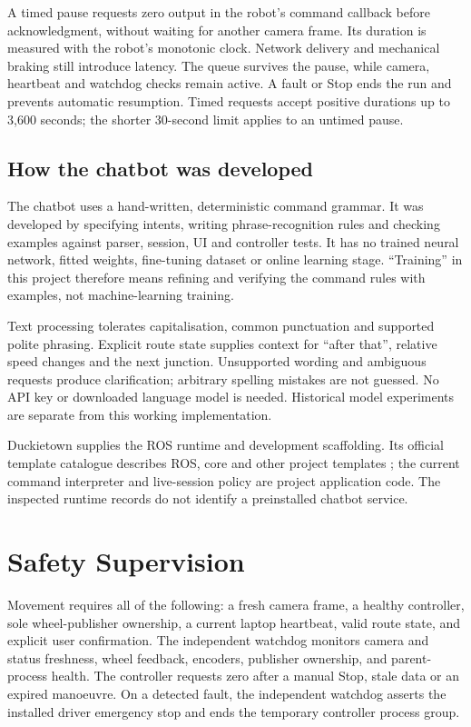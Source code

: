\documentclass[10pt,a4paper,twocolumn]{article}
\begin{document}
A timed pause requests zero output in the robot's command callback before
acknowledgment, without waiting for another camera frame. Its duration is
measured with the robot's monotonic clock. Network delivery and mechanical
braking still introduce latency. The queue survives the pause, while camera,
heartbeat and watchdog checks remain active. A fault or Stop ends the run and
prevents automatic resumption. Timed requests accept positive durations up to
3,600 seconds; the shorter 30-second limit applies to an untimed pause.

\subsection{How the chatbot was developed}

The chatbot uses a hand-written, deterministic command grammar. It was
developed by specifying intents, writing phrase-recognition rules and checking
examples against parser, session, UI and controller tests. It has no trained
neural network, fitted weights, fine-tuning dataset or online learning stage.
``Training'' in this project therefore means refining and verifying the command
rules with examples, not machine-learning training.

Text processing tolerates capitalisation, common punctuation and supported
polite phrasing. Explicit route state supplies context for ``after that'',
relative speed changes and the next junction. Unsupported wording and
ambiguous requests produce clarification; arbitrary spelling mistakes are not
guessed. No API key or downloaded language model is needed. Historical model
experiments are separate from this working implementation.

Duckietown supplies the ROS runtime and development scaffolding. Its official
template catalogue describes ROS, core and other project templates
\cite{templates}; the current command interpreter and live-session policy are
project application code. The inspected runtime records do not identify a
preinstalled chatbot service.

\section{Safety Supervision}

Movement requires all of the following: a fresh camera frame, a healthy
controller, sole wheel-publisher ownership, a current laptop heartbeat, valid
route state, and explicit user confirmation. The independent watchdog monitors
camera and status freshness, wheel feedback, encoders, publisher ownership, and
parent-process health. The controller requests zero after a manual Stop, stale data or an expired
manoeuvre. On a detected fault, the independent watchdog asserts the installed
driver emergency stop and ends the temporary controller process group.
\end{document}
